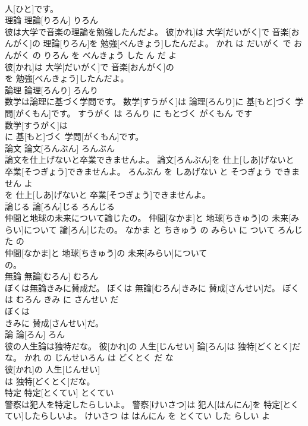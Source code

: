 \documentclass[8pt]{extreport}
\begin{document}
\begin{CJK}{UTF8}{min}
\\	人[ひと]です。			
\\	理論	理論[りろん]	りろん	
\\	彼は大学で音楽の理論を勉強したんだよ。	彼[かれ]は 大学[だいがく]で 音楽[おんがく]の 理論[りろん]を 勉強[べんきょう]したんだよ。	かれ は だいがく で おんがく の りろん を べんきょう した ん だ よ	
\\	彼[かれ]は 大学[だいがく]で 音楽[おんがく]の
\\	を 勉強[べんきょう]したんだよ。			
\\	論理	論理[ろんり]	ろんり	
\\	数学は論理に基づく学問です。	数学[すうがく]は 論理[ろんり]に 基[もと]づく 学問[がくもん]です。	すうがく は ろんり に もとづく がくもん です	
\\	数学[すうがく]は
\\	に 基[もと]づく 学問[がくもん]です。			
\\	論文	論文[ろんぶん]	ろんぶん	
\\	論文を仕上げないと卒業できませんよ。	論文[ろんぶん]を 仕上[しあ]げないと 卒業[そつぎょう]できませんよ。	ろんぶん を しあげない と そつぎょう できません よ	
\\	を 仕上[しあ]げないと 卒業[そつぎょう]できませんよ。			
\\	論じる	論[ろん]じる	ろんじる	
\\	仲間と地球の未来について論じたの。	仲間[なかま]と 地球[ちきゅう]の 未来[みらい]について 論[ろん]じたの。	なかま と ちきゅう の みらい に ついて ろんじた の	
\\	仲間[なかま]と 地球[ちきゅう]の 未来[みらい]について
\\	の。			
\\	無論	無論[むろん]	むろん	
\\	ぼくは無論きみに賛成だ。	ぼくは 無論[むろん]きみに 賛成[さんせい]だ。	ぼく は むろん きみ に さんせい だ	
\\	ぼくは
\\	きみに 賛成[さんせい]だ。			
\\	論	論[ろん]	ろん	
\\	彼の人生論は独特だな。	彼[かれ]の 人生[じんせい] 論[ろん]は 独特[どくとく]だな。	かれ の じんせいろん は どくとく だ な	
\\	彼[かれ]の 人生[じんせい]
\\	は 独特[どくとく]だな。			
\\	特定	特定[とくてい]	とくてい	
\\	警察は犯人を特定したらしいよ。	警察[けいさつ]は 犯人[はんにん]を 特定[とくてい]したらしいよ。	けいさつ は はんにん を とくてい した らしい よ	

\end{CJK}
\end{document}
